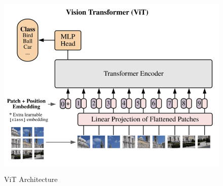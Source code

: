 \begin{figure}[ht]
\includegraphics[width=13.5cm, height=9cm]{images/vision transformer.png}
\centering
\caption{ViT Architecture \protect\cite{16x16}}
\label{fig:vit}
\end{figure}

